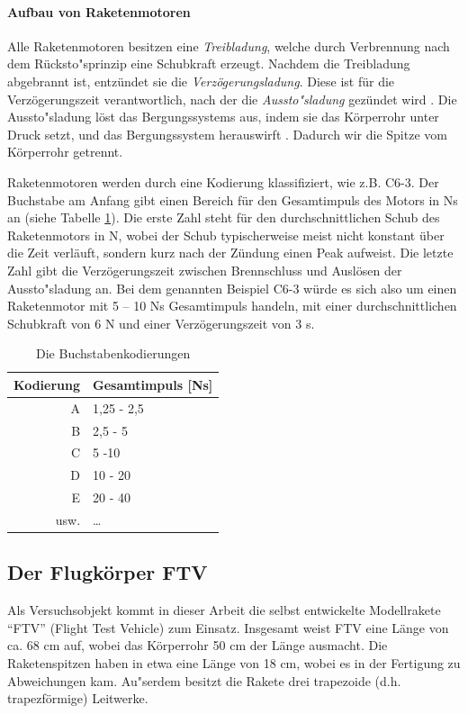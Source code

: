 \documentclass[10pt,a4paper]{article}
\begin{document}
\paragraph{Aufbau von Raketenmotoren}
Alle Raketenmotoren besitzen eine \textit{Treibladung}, welche durch Verbrennung nach dem Rücksto"sprinzip eine Schubkraft erzeugt.
Nachdem die Treibladung abgebrannt ist, entzündet sie die \textit{Verzögerungsladung}. Diese ist für die Verzögerungszeit verantwortlich, nach der die \textit{Aussto"sladung} gezündet wird \cite{sn}.
Die Aussto"sladung löst das  Bergungssystems aus, indem sie das Körperrohr unter Druck setzt, und das Bergungssystem herauswirft \cite{om}. Dadurch wir die Spitze vom Körperrohr getrennt.

Raketenmotoren werden durch eine Kodierung klassifiziert, wie z.B. \textsf{C6-3}. Der Buchstabe am Anfang gibt einen Bereich für den Gesamtimpuls des Motors in Ns an (siehe Tabelle \ref{tab-Motorkodierungen}).
Die erste Zahl steht für den durchschnittlichen Schub des Raketenmotors in N, wobei der Schub typischerweise meist nicht konstant über die Zeit verläuft, sondern kurz nach der Zündung einen Peak aufweist.
Die letzte Zahl gibt die Verzögerungszeit zwischen Brennschluss und Auslösen der Aussto"sladung an. Bei dem genannten Beispiel \textsf{C6-3} würde es sich also um einen Raketenmotor mit 5 -- 10 Ns Gesamtimpuls handeln, mit einer durchschnittlichen Schubkraft von 6 N und einer Verzögerungszeit von 3 s. 

\begin{table}[H]
\caption{Die Buchstabenkodierungen}
\label{tab-Motorkodierungen}
\centering
\begin{tabular}{r|l}
	\toprule
	Kodierung & Gesamtimpuls [Ns] \\
	\midrule
	A & 1,25 - 2,5 \\
	B & 2,5 - 5 \\
	C & 5 -10 \\
	D & 10 - 20 \\
	E & 20 - 40 \\
	usw. & \dots \\
	\bottomrule
\end{tabular}
\end{table}


\subsection{Der Flugkörper FTV}

Als Versuchsobjekt kommt in dieser Arbeit die selbst entwickelte Modellrakete "`FTV"' (Flight Test Vehicle) zum Einsatz. Insgesamt weist FTV eine Länge von ca. 68 cm auf, wobei das Körperrohr 50 cm der Länge ausmacht. Die Raketenspitzen haben in etwa eine Länge von 18 cm, wobei es in der Fertigung zu Abweichungen kam. Au"serdem besitzt die Rakete drei trapezoide (d.h. trapezförmige) Leitwerke.
\end{document}
